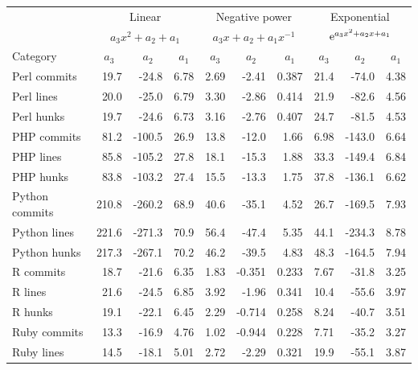 \documentclass[pdflatex, sn-mathphys, referee]{sn-jnl}%
\theoremstyle{thmstyleone}%
\theoremstyle{thmstyletwo}%
\theoremstyle{thmstylethree}%
\def\tablelinesep{}
\newcommand{\esup}[1]{{\rm e}^{#1}}
\theoremstyle{thmstyleone}
\begin{document}
\begin{table}
\begin{center}
\begin{minipage}{0.73\textwidth}
\begin{tabular*}{\textwidth}{l r r r r r r r r r }
\toprule%
  & \multicolumn{3}{c}{Linear} & \multicolumn{3}{c}{Negative power} & \multicolumn{3}{c}{Exponential} \\
  & \multicolumn{3}{c}{$a_3 x^2 + a_2 + a_1$} & \multicolumn{3}{c}{$a_3 x + a_2 + a_1 x^{-1}$} & \multicolumn{3}{c}{$\esup{a_3 x^2 + a_2 x + a_1}$} \\
Category & \multicolumn{1}{c}{$a_3$} & \multicolumn{1}{c}{$a_2$} & \multicolumn{1}{c}{$a_1$} & \multicolumn{1}{c}{$a_3$} & \multicolumn{1}{c}{$a_2$} & \multicolumn{1}{c}{$a_1$} & \multicolumn{1}{c}{$a_3$} & \multicolumn{1}{c}{$a_2$} & \multicolumn{1}{c}{$a_1$} \\
\midrule
Perl commits & 19.7 & -24.8 & 6.78 & 2.69 & -2.41 & 0.387 & 21.4 & -74.0 & 4.38 \\
Perl lines & 20.0 & -25.0 & 6.79 & 3.30 & -2.86 & 0.414 & 21.9 & -82.6 & 4.56 \\
Perl hunks & 19.7 & -24.6 & 6.73 & 3.16 & -2.76 & 0.407 & 24.7 & -81.5 & 4.53 \\ \tablelinesep
PHP commits & 81.2 & -100.5 & 26.9 & 13.8 & -12.0 & 1.66 & 6.98 & -143.0 & 6.64 \\
PHP lines & 85.8 & -105.2 & 27.8 & 18.1 & -15.3 & 1.88 & 33.3 & -149.4 & 6.84 \\
PHP hunks & 83.8 & -103.2 & 27.4 & 15.5 & -13.3 & 1.75 & 37.8 & -136.1 & 6.62 \\ \tablelinesep
Python commits & 210.8 & -260.2 & 68.9 & 40.6 & -35.1 & 4.52 & 26.7 & -169.5 & 7.93 \\
Python lines & 221.6 & -271.3 & 70.9 & 56.4 & -47.4 & 5.35 & 44.1 & -234.3 & 8.78 \\
Python hunks & 217.3 & -267.1 & 70.2 & 46.2 & -39.5 & 4.83 & 48.3 & -164.5 & 7.94 \\ \tablelinesep
R commits & 18.7 & -21.6 & 6.35 & 1.83 & -0.351 & 0.233 & 7.67 & -31.8 & 3.25 \\
R lines & 21.6 & -24.5 & 6.85 & 3.92 & -1.96 & 0.341 & 10.4 & -55.6 & 3.97 \\
R hunks & 19.1 & -22.1 & 6.45 & 2.29 & -0.714 & 0.258 & 8.24 & -40.7 & 3.51 \\ \tablelinesep
Ruby commits & 13.3 & -16.9 & 4.76 & 1.02 & -0.944 & 0.228 & 7.71 & -35.2 & 3.27 \\
Ruby lines & 14.5 & -18.1 & 5.01 & 2.72 & -2.29 & 0.321 & 19.9 & -55.1 & 3.87 \\

\end{tabular*}
\end{minipage}
\end{center}
\end{table}
\end{document}
